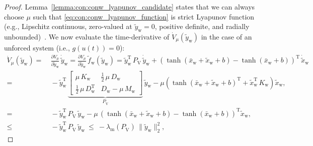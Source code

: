 \begin{proof}
    Lemma~\ref{lemma:con:conw_lyapunov_candidate} states that we can always choose $\mu$ such that \eqref{eq:con:conw_lyapunov_function} is strict Lyapunov function (e.g., Lipschitz continuous, zero-valued at $\tilde{y}_\mathrm{w} = 0$, positive definite, and radially unbounded)~\citep{khalil2002nonlinear, wu2022passive}. We now evaluate the time-derivative of $\dot{V}_\mu(\tilde{y}_\mathrm{w})$ in the case of an unforced system (i.e., $g(u(t)) = 0$):
    \begin{equation}\label{eq:con:lyapunov_function_time_derivative}
    \begin{split}
        \dot{V}_\mu(\tilde{y}_\mathrm{w}) =& \: \frac{\partial V_\mu}{\partial \tilde{y}_\mathrm{w}} \, \dot{\tilde{y}}_\mathrm{w} = \frac{\partial V_\mu}{\partial \tilde{y}_\mathrm{w}} \, \tilde{f}_\mathrm{w}(\tilde{y}_\mathrm{w}) 
        = \tilde{y}_\mathrm{w}^\mathrm{T} \, P_\mathrm{V} \, \dot{\tilde{y}}_\mathrm{w} + \left (\tanh(\bar{x}_\mathrm{w} + \tilde{x}_\mathrm{w} + b) - \tanh(\bar{x}_\mathrm{w} + b)\right )^\mathrm{T} \, \dot{\tilde{x}}_\mathrm{w}\\
        =& \: -\tilde{y}_\mathrm{w}^\mathrm{T} \, \underbrace{\begin{bmatrix}
            \mu \, K_\mathrm{w} & \frac{1}{2} \, \mu \, D_\mathrm{w}\\
            \frac{1}{2} \, \mu \, D_\mathrm{w}^\mathrm{T} & D_\mathrm{w} - \mu \, M_\mathrm{w}
        \end{bmatrix}}_{P_{\dot{\mathrm{V}}}} \, \tilde{y}_\mathrm{w} - \mu \left ( \tanh(\bar{x}_\mathrm{w} + \tilde{x}_\mathrm{w} + b)^\mathrm{T} + \tilde{x}_\mathrm{w}^\mathrm{T} \, K_\mathrm{w} \right ) \tilde{x}_\mathrm{w},\\
        =& \: -\tilde{y}_\mathrm{w}^\mathrm{T} \, P_{\dot{\mathrm{V}}} \, \tilde{y}_\mathrm{w} - \mu \, \left ( \tanh(\bar{x}_\mathrm{w} + \tilde{x}_\mathrm{w} + b) - \tanh(\bar{x}_\mathrm{w} + b) \right )^\mathrm{T} \tilde{x}_\mathrm{w},\\
        \leq& \: -\tilde{y}_\mathrm{w}^\mathrm{T} \, P_{\dot{\mathrm{V}}} \, \tilde{y}_\mathrm{w} 
        \: \leq \: -\lambda_\mathrm{m}\left(P_{\dot{\mathrm{V}}} \right) \, \lVert \tilde{y}_\mathrm{w} \rVert_2^2,
    \end{split}
    \end{equation}

\end{proof}
